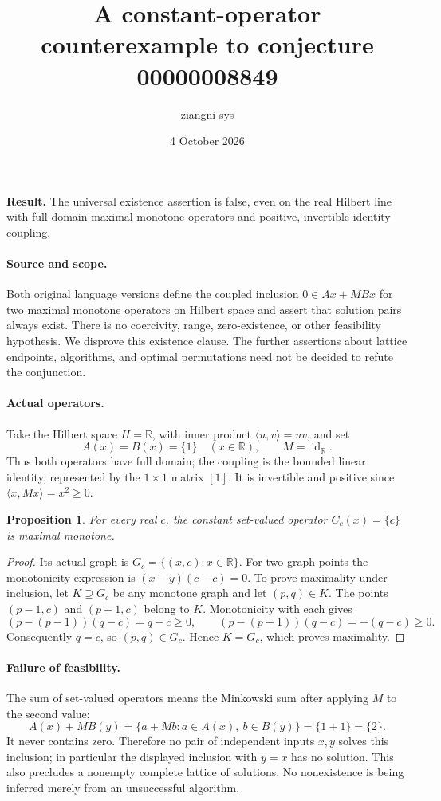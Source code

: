 \documentclass[11pt]{article}
\title{A constant-operator counterexample to conjecture 00000008849}
\author{ziangni-sys}
\date{4 October 2026}
\newtheorem{proposition}{Proposition}
\begin{document}
\raggedright
\maketitle
\noindent\textbf{Result.} The universal existence assertion is false, even on the real Hilbert line with full-domain maximal monotone operators and positive, invertible identity coupling.

\paragraph{Source and scope.}
Both original language versions define the coupled inclusion
\(0\in Ax+MBx\) for two maximal monotone operators on Hilbert space and assert that solution pairs always exist. There is no coercivity, range, zero-existence, or other feasibility hypothesis. We disprove this existence clause. The further assertions about lattice endpoints, algorithms, and optimal permutations need not be decided to refute the conjunction.

\paragraph{Actual operators.}
Take the Hilbert space \(H=\mathbb R\), with inner product
\(\langle u,v\rangle=uv\), and set
\[
 A(x)=B(x)=\{1\}\quad(x\in\mathbb R),\qquad
 M=\operatorname{id}_{\mathbb R}.
\]
Thus both operators have full domain; the coupling is the bounded linear identity, represented by the \(1\times1\) matrix \([1]\). It is invertible and positive since \(\langle x,Mx\rangle=x^2\geq0\).

\begin{proposition}
For every real \(c\), the constant set-valued operator \(C_c(x)=\{c\}\) is maximal monotone.
\end{proposition}
\begin{proof}
Its actual graph is \(G_c=\{(x,c):x\in\mathbb R\}\).
For two graph points the monotonicity expression is
\((x-y)(c-c)=0\).
To prove maximality under inclusion, let \(K\supseteq G_c\) be any monotone graph and let \((p,q)\in K\).
The points \((p-1,c)\) and \((p+1,c)\) belong to \(K\).
Monotonicity with each gives
\[
 (p-(p-1))(q-c)=q-c\geq0,\qquad
 (p-(p+1))(q-c)=-(q-c)\geq0.
\]
Consequently \(q=c\), so \((p,q)\in G_c\). Hence \(K=G_c\), which proves maximality.
\end{proof}

\paragraph{Failure of feasibility.}
The sum of set-valued operators means the Minkowski sum after applying \(M\) to the second value:
\[
 A(x)+M B(y)
 =\{a+Mb:a\in A(x),\ b\in B(y)\}
 =\{1+1\}=\{2\}.
\]
It never contains zero. Therefore no pair of independent inputs \(x,y\) solves this inclusion; in particular the displayed inclusion with \(y=x\) has no solution. This also precludes a nonempty complete lattice of solutions. No nonexistence is being inferred merely from an unsuccessful algorithm.
\newpage
\end{document}
